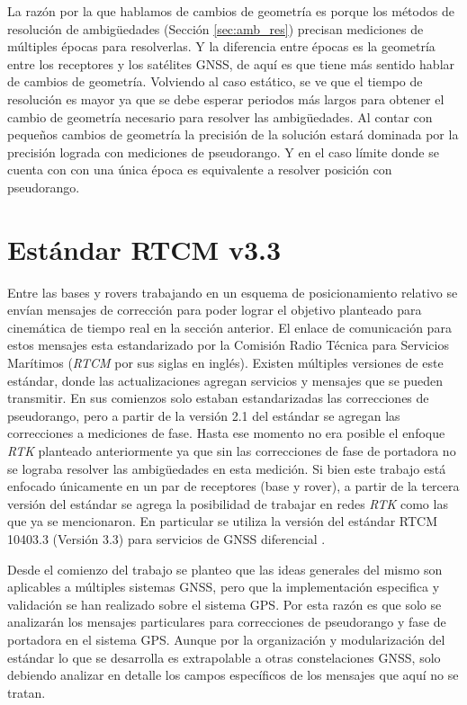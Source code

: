 \documentclass[a4paper,12pt,oneside,onecolumn,final,openright]{book}%
\begin{document}
	La razón por la que hablamos de cambios de geometría es porque los métodos de resolución de ambigüedades (Sección \ref{sec:amb_res}) precisan mediciones de múltiples épocas para resolverlas. Y la diferencia entre épocas es la geometría entre los receptores y los satélites GNSS, de aquí es que tiene más sentido hablar de cambios de geometría. Volviendo al caso estático, se ve que el tiempo de resolución es mayor ya que se debe esperar periodos más largos para obtener el cambio de geometría necesario para resolver las ambigüedades. Al contar con pequeños cambios de geometría la precisión de la solución estará dominada por la precisión lograda con mediciones de pseudorango. Y en el caso límite donde se cuenta con con una única época es equivalente a resolver posición con pseudorango.

\section{Estándar RTCM v3.3}
	Entre las bases y rovers trabajando en un esquema de posicionamiento relativo se envían mensajes de corrección para poder lograr el objetivo planteado para cinemática de tiempo real en la sección anterior. El enlace de comunicación para estos mensajes esta estandarizado por la Comisión Radio Técnica para Servicios Marítimos (\textit{RTCM} por sus siglas en inglés). Existen múltiples versiones de este estándar, donde las actualizaciones agregan servicios y mensajes que se pueden transmitir. En sus comienzos solo estaban estandarizadas las correcciones de pseudorango, pero a partir de la versión 2.1 del estándar se agregan las correcciones a mediciones de fase. Hasta ese momento no era posible el enfoque \textit{RTK} planteado anteriormente ya que sin las correcciones de fase de portadora no se lograba resolver las ambigüedades en esta medición. Si bien este trabajo está enfocado únicamente en un par de receptores (base y rover), a partir de la tercera versión del estándar se agrega la posibilidad de trabajar en redes \textit{RTK} como las que ya se mencionaron. En particular se utiliza la versión del estándar RTCM 10403.3 (Versión 3.3) para servicios de GNSS diferencial \cite{rtcm}.
	
	Desde el comienzo del trabajo se planteo que las ideas generales del mismo son aplicables a múltiples sistemas GNSS, pero que la implementación especifica y validación se han realizado sobre el sistema GPS. Por esta razón es que solo se analizarán los mensajes particulares para correcciones de pseudorango y fase de portadora en el sistema GPS. Aunque por la organización y modularización del estándar lo que se desarrolla es extrapolable a otras constelaciones GNSS, solo debiendo analizar en detalle los campos específicos de los mensajes que aquí no se tratan.
	
\end{document}
